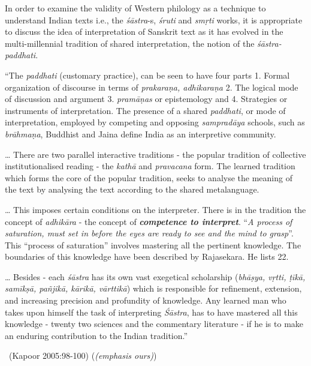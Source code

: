 In order to examine the validity of Western philology as a technique to understand Indian texts i.e., the \textit{śāstra}-s, \textit{śruti} and \textit{smṛti} works, it is appropriate to discuss the idea of interpretation of Sanskrit text as it has evolved in the multi-millennial tradition of shared interpretation, the notion of the \textit{śāstra-paddhati}.

\begin{myquote}
“The \textit{paddhati} (customary practice), can be seen to have four parts 1. Formal organization of discourse in terms of \textit{prakaraṇa, adhikaraṇa} 2. The logical mode of discussion and argument 3. \textit{pramāṇas} or epistemology and 4. Strategies or instruments of interpretation. The presence of a shared \textit{paddhati}, or mode of interpretation, employed by competing and opposing \textit{sampradāya} schools, such as \textit{brāhmaṇa}, Buddhist and Jaina define India as an interpretive community.
\end{myquote}

\begin{myquote}
… There are two parallel interactive traditions - the popular tradition of collective institutionalised reading - the \textit{kathā} and \textit{pravacana} form. The learned tradition which forms the core of the popular tradition, seeks to analyse the meaning of the text by analysing the text according to the shared metalanguage.
\end{myquote}

\begin{myquote}
… This imposes certain conditions on the interpreter. There is in the tradition the concept of \textit{adhikāra} - the concept of \textbf{\textit{competence to interpret}}. “\textit{A process of saturation, must set in before the eyes are ready to see and the mind to grasp}”. This “process of saturation” involves mastering all the pertinent knowledge. The boundaries of this knowledge have been described by Rajasekara. He lists 22.
\end{myquote}

\begin{myquote}
… Besides - each \textit{śāstra} has its own vast exegetical scholarship (\textit{bhāṣya, vṛtti, ṭīkā, samīkṣā, pañjikā, kārikā, vārttikā}) which is responsible for refinement, extension, and increasing precision and profundity of knowledge. Any learned man who takes upon himself the task of interpreting \textit{Śāstra}, has to have mastered all this knowledge - twenty two sciences and the commentary literature - if he is to make an enduring contribution to the Indian tradition.”

~\hfill (Kapoor 2005:98-100) (\textit{(emphasis ours)})
\end{myquote}

